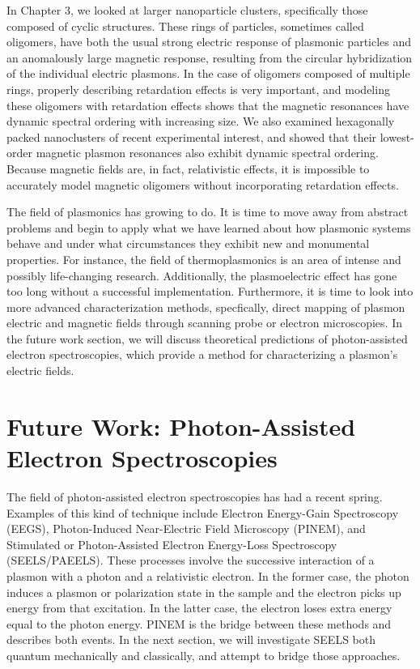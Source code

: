 \documentclass [11pt, proquest] {uwthesis}[2016/11/22]
\begin{document}
In Chapter 3, we looked at larger nanoparticle clusters, specifically those composed of cyclic structures. These rings of particles, sometimes called oligomers, have both the usual strong electric response of plasmonic particles and an anomalously large magnetic response, resulting from the circular hybridization of the individual electric plasmons. In the case of oligomers composed of multiple rings, properly describing retardation effects is very important, and modeling these oligomers with retardation effects shows that the magnetic resonances have dynamic spectral ordering with increasing size. We also examined hexagonally packed nanoclusters of recent experimental interest, and showed that their lowest-order magnetic plasmon resonances also exhibit dynamic spectral ordering. Because magnetic fields are, in fact, relativistic effects, it is impossible to accurately model magnetic oligomers without incorporating retardation effects.

The field of plasmonics has growing to do. It is time to move away from abstract problems and begin to apply what we have learned about how plasmonic systems behave and under what circumstances they exhibit new and monumental properties. For instance, the field of thermoplasmonics is an area of intense and possibly life-changing research. Additionally, the plasmoelectric effect has gone too long without a successful implementation. Furthermore, it is time to look into more advanced characterization methods, specfically, direct mapping of plasmon electric and magnetic fields through scanning probe or electron microscopies. In the future work section, we will discuss theoretical predictions of photon-assisted electron spectroscopies, which provide a method for characterizing a plasmon's electric fields.

\section{Future Work: Photon-Assisted Electron Spectroscopies}

The field of photon-assisted electron spectroscopies has had a recent spring. Examples of this kind of technique include Electron Energy-Gain Spectroscopy (EEGS), Photon-Induced Near-Electric Field Microscopy (PINEM), and Stimulated or Photon-Assisted Electron Energy-Loss Spectroscopy (SEELS/PAEELS). These processes involve the successive interaction of a plasmon with a photon and a relativistic electron. In the former case, the photon induces a plasmon or polarization state in the sample and the electron picks up energy from that excitation. In the latter case, the electron loses extra energy equal to the photon energy. PINEM is the bridge between these methods and describes both events. In the next section, we will investigate SEELS both quantum mechanically and classically, and attempt to bridge those approaches.
\end{document}
